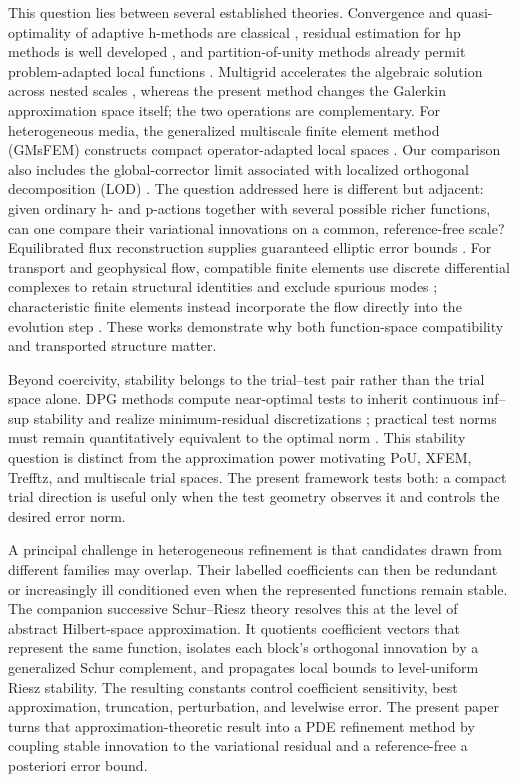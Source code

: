 \documentclass[11pt]{article}
\numberwithin{algorithm}{section}
\theoremstyle{definition}\newtheorem{definition}[theorem]{Definition}
\theoremstyle{remark}\newtheorem{remark}[theorem]{Remark}
\begin{document}
This question lies between several established theories.  Convergence and
quasi-optimality of adaptive h-methods are classical
\cite{binevdahmendevore2004,casconetal2008}, residual estimation for hp methods
is well developed \cite{melenkwohlmuth2001}, and partition-of-unity methods
already permit problem-adapted local functions \cite{babuskamelenk1997}.
Multigrid accelerates the algebraic solution across nested scales
\cite{trottenbergoosterleeschuller2001}, whereas the present method changes the
Galerkin approximation space itself; the two operations are complementary.
For heterogeneous media, the generalized multiscale finite element method
(GMsFEM) constructs compact operator-adapted local spaces
\cite{efendievgalvishou2013}.  Our comparison also includes the global-corrector
limit associated with localized orthogonal decomposition (LOD)
\cite{malqvistpeterseim2014}.  The question addressed
here is different but adjacent: given ordinary h- and p-actions together
with several possible richer functions, can one compare their variational
innovations on a common, reference-free scale?
Equilibrated flux reconstruction supplies guaranteed elliptic error bounds
\cite{braessschoberl2008,ernvohralik2015}.  For transport and geophysical flow,
compatible finite elements use discrete differential complexes to retain
structural identities and exclude spurious modes \cite{cotter2023};
characteristic finite elements instead incorporate the flow directly into the
evolution step \cite{douglasrussell1982}.  These works demonstrate why both
function-space compatibility and transported structure matter.

Beyond coercivity, stability belongs to the trial--test pair rather than the
trial space alone. DPG methods compute near-optimal tests to inherit continuous
inf--sup stability and realize minimum-residual discretizations
\cite{demkowiczgopalakrishnan2011}; practical test norms must remain
quantitatively equivalent to the optimal norm
\cite{chanheuer2021}.  This stability question is distinct from the
approximation power motivating PoU, XFEM, Trefftz, and multiscale trial
spaces.  The present framework tests both: a compact trial direction is useful
only when the test geometry observes it and controls the desired error norm.

A principal challenge in heterogeneous refinement is that candidates drawn
from different families may overlap. Their labelled coefficients can
then be redundant or increasingly ill conditioned even when the represented
functions remain stable.  The companion
successive Schur--Riesz theory \cite{dixon2026schurriesz} resolves this at the
level of abstract Hilbert-space approximation.  It quotients coefficient
vectors that represent the same function, isolates each block's orthogonal
innovation by a generalized Schur complement, and propagates local bounds to
level-uniform Riesz stability.  The resulting constants control coefficient
sensitivity, best approximation, truncation, perturbation, and levelwise
error.  The present paper turns that approximation-theoretic result into a PDE
refinement method by coupling stable innovation to the variational residual
and a reference-free a posteriori error bound.
\end{document}
